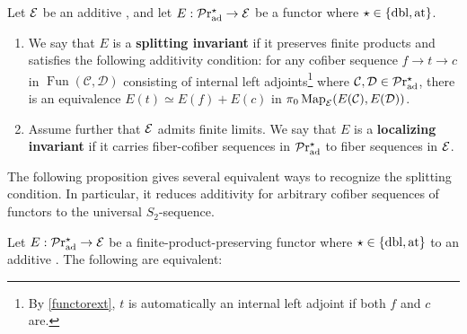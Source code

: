 \documentclass[a4paper,10pt, oneside]{amsart}
\begin{document}
\begin{de}\label{deflocinv}
	Let $\mathcal{E}$ be an additive \infcat, and let $E: \mathcal{P}\mathrm{r}_{\mathrm{ad}}^\star \to \mathcal{E}$ be a functor where $\star \in \{ \mathrm{dbl}, \mathrm{at} \}$.
	\begin{enumerate}[label=(\arabic*), font=\normalfont]
		\item We say that $E$ is a \textbf{splitting invariant} if it preserves finite products and satisfies the following additivity condition: for any cofiber sequence $f \to t \to c$ in $\operatorname{Fun}(\mathcal{C}, \mathcal{D})$ consisting of internal left adjoints\footnote{By \cref{functorext}, $t$ is automatically an internal left adjoint if both $f$ and $c$ are.} where $\mathcal{C},\mathcal{D}\in \mathcal{P}\mathrm{r}_{\mathrm{ad}}^\star$, there is an equivalence $E(t) \simeq E(f)+ E(c)$ in $\pi_0\operatorname{Map}_{\mathcal{E}}(E(\mathcal{C}),E(\mathcal{D}))$.
		
		\item Assume further that $\mathcal{E}$ admits finite limits. We say that $E$ is a \textbf{localizing invariant} if it carries fiber-cofiber sequences in $\mathcal{P}\mathrm{r}_{\mathrm{ad}}^\star$ to fiber sequences in $\mathcal{E}$.
	\end{enumerate}
\end{de}
	The following proposition gives several equivalent ways to recognize the splitting condition. In particular, it reduces additivity for arbitrary cofiber sequences of functors to the universal \(S_2\)-sequence.
	\begin{prop}\label{splinvchar}
		Let $E: \mathcal{P}\mathrm{r}_{\mathrm{ad}}^\star \rightarrow \mathcal{E}$ be a finite-product-preserving functor where $\star \in \{ \mathrm{dbl}, \mathrm{at} \}$ to an additive \infcat \mce. The following are equivalent:
	\end{prop}
\end{document}
